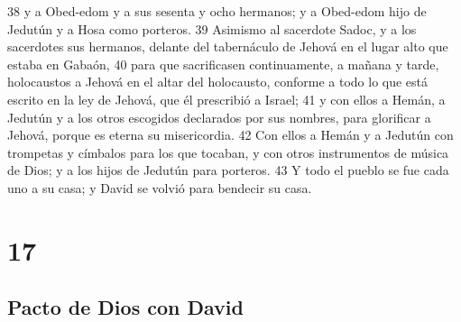 38 y a Obed-edom y a sus sesenta y ocho hermanos; y a Obed-edom hijo de Jedutún y a Hosa como porteros.
39 Asimismo al sacerdote Sadoc, y a los sacerdotes sus hermanos, delante del tabernáculo de Jehová en el lugar alto que estaba en Gabaón,
40 para que sacrificasen continuamente, a mañana y tarde, holocaustos a Jehová en el altar del holocausto, conforme a todo lo que está escrito en la ley de Jehová, que él prescribió a Israel;
41 y con ellos a Hemán, a Jedutún y a los otros escogidos declarados por sus nombres, para glorificar a Jehová, porque es eterna su misericordia. 
42 Con ellos a Hemán y a Jedutún con trompetas y címbalos para los que tocaban, y con otros instrumentos de música de Dios; y a los hijos de Jedutún para porteros.
43 Y todo el pueblo se fue cada uno a su casa; y David se volvió para bendecir su casa. 

\chapter{17}

\section*{Pacto de Dios con David}

